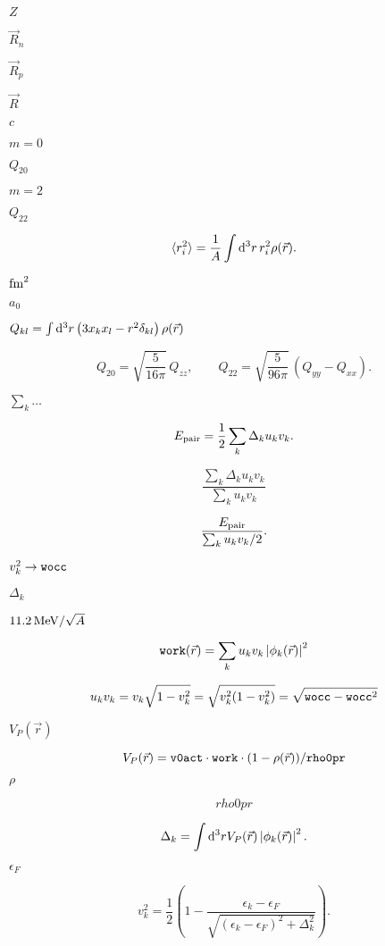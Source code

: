 \documentclass{article}
\begin{document}
$ Z $
\pagebreak

$ \vec R_n $
\pagebreak

$ \vec R_p $
\pagebreak

$ \vec R $
\pagebreak

$ c $
\pagebreak

$ m=0 $
\pagebreak

$ Q_{20} $
\pagebreak

$ m=2 $
\pagebreak

$ Q_{22} $
\pagebreak

\[ \langle r_i^2\rangle=\frac1{A} \int {\mathrm d}^3r\, r_i^2\rho(\vec r). \]
\pagebreak

${\rm fm}^2 $
\pagebreak

$ a_0 $
\pagebreak

$ Q_{kl}=\int {\mathrm d}^3r \left(3x_kx_l-r^2\delta_{kl}\right) \rho(\vec r) $
\pagebreak

\[ Q_{20}=\sqrt{\frac{5}{16\pi}}\,Q_{zz},\qquad Q_{22}=\sqrt{\frac{5}{96\pi}}\,\left(Q_{yy}-Q_{xx}\right). \]
\pagebreak

$ \sum_k\ldots $
\pagebreak

\[ E_{\rm pair}=\frac1{2}\sum_k \Delta_k u_k v_k. \]
\pagebreak

\[ \frac{\sum_k\Delta_ku_kv_k}{\sum_k u_kv_k} \]
\pagebreak

\[ \frac{E_{\rm pair}}{\sum_k u_k v_k/2}.\]
\pagebreak

$ v_k^2\rightarrow {\tt wocc} $
\pagebreak

$ \Delta_k $
\pagebreak

$ 11.2\,{\rm MeV}/\sqrt{A} $
\pagebreak

\[ {\tt work}(\vec r)=\sum_k u_kv_k\left|\phi_k(\vec r)\right|^2 \]
\pagebreak

\[ u_kv_k=v_k\sqrt{1-v_k^2}=\sqrt{v_k^2(1-v_k^2)}=\sqrt{{\tt wocc}-{\tt wocc}^2} \]
\pagebreak

$ V_P(\vec r) $
\pagebreak

\[ V_P(\vec r)={\tt v0act}\cdot{\tt work}\cdot (1-\rho(\vec r))/{\tt rho0pr} \]
\pagebreak

$ \rho $
\pagebreak

\[ rho0pr \]
\pagebreak

\[ \Delta_k=\int{\mathrm d}^3r V_P(\vec r)\left|\phi_k(\vec r)\right|^2. \]
\pagebreak

$ \epsilon_F $
\pagebreak

\[ v_k^2=\frac1{2}\left(1-\frac{\epsilon_k-\epsilon_F} {\sqrt{(\epsilon_k-\epsilon_F)^2+\Delta_k^2}}\right). \]
\pagebreak
\end{document}
